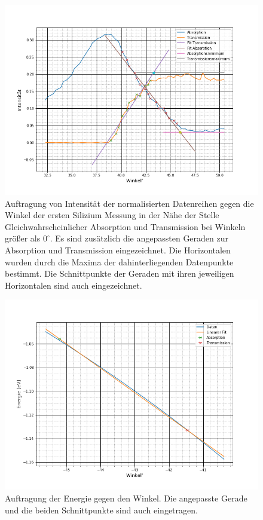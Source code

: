 \begin{figure}[h]
	\centering

	\includegraphics[scale=0.5]{Bilder/si_1_r}
	\caption[Geraden Anpassungen erste Silizium Messung rechts]{\small Auftragung von Intensität der normalisierten Datenreihen gegen die  Winkel der ersten Silizium Messung in der Nähe der Stelle Gleichwahrscheinlicher Absorption und Transmission bei Winkeln größer als $0^\circ$. Es sind zusätzlich die angepassten Geraden zur Absorption und Transmission eingezeichnet. Die Horizontalen wurden durch die Maxima der dahinterliegenden Datenpunkte bestimmt. Die Schnittpunkte der Geraden mit ihren jeweiligen Horizontalen sind auch eingezeichnet.}
	\label{si_1_r}	
\end{figure}

\begin{figure}[h]
	\centering

	\includegraphics[scale=0.5]{Bilder/si_1_l_energie}
	\caption[Beispiel Energiebestimmung]{\small Auftragung der Energie gegen den Winkel. Die angepasste Gerade und die beiden Schnittpunkte sind auch eingetragen.}
	\label{si_1_l_en}	
\end{figure}

